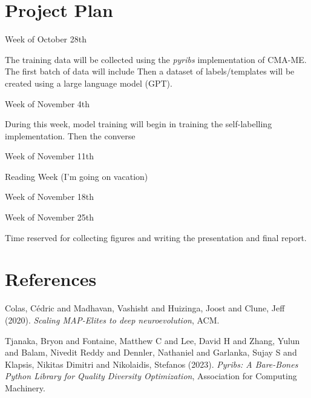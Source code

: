 \documentclass[11pt]{article}
\begin{document}
\section{Project Plan}
\label{sec:org5f53c15}

Week of October 28th

The training data will be collected using the \emph{pyribs} implementation of CMA-ME.
The first batch of data will include 
Then a dataset of labels/templates will be created using a large language model (GPT).

Week of November 4th

During this week, model training will begin in training the self-labelling implementation.
Then the converse


Week of November 11th

Reading Week (I'm going on vacation)

Week of November 18th



Week of November 25th

Time reserved for collecting figures and writing the presentation and final report.

\section{References}
\label{sec:org0b9e514}

\noindent
Colas, Cédric and Madhavan, Vashisht and Huizinga, Joost and Clune, Jeff (2020). \emph{Scaling MAP-Elites to deep neuroevolution}, ACM.

\noindent
Tjanaka, Bryon and Fontaine, Matthew C and Lee, David H and Zhang, Yulun and Balam, Nivedit Reddy and Dennler, Nathaniel and Garlanka, Sujay S and Klapsis, Nikitas Dimitri and Nikolaidis, Stefanos (2023). \emph{Pyribs: A Bare-Bones Python Library for Quality Diversity Optimization}, Association for Computing Machinery.
\end{document}

